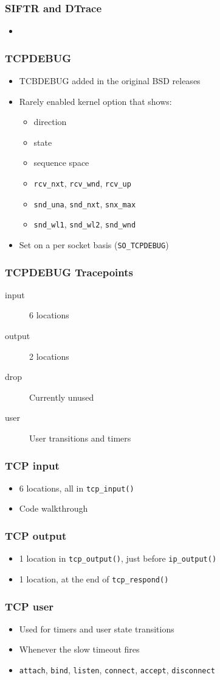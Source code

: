 \documentclass[pdftex]{beamer}
\begin{document}
\begin{frame}
  \frametitle{SIFTR and DTrace}
  \begin{itemize}
  \item 
  \end{itemize}
\end{frame}

\begin{frame}[fragile]
  \frametitle{TCPDEBUG}
  \begin{itemize}
  \item TCBDEBUG added in the original BSD releases
  \item Rarely enabled kernel option that shows:
    \begin{itemize}
    \item direction
    \item state
    \item sequence space
    \item \verb|rcv_nxt|, \verb|rcv_wnd|, \verb|rcv_up|
    \item \verb|snd_una|, \verb|snd_nxt|, \verb|snx_max|
    \item \verb|snd_wl1|, \verb|snd_wl2|, \verb|snd_wnd|
    \end{itemize}
  \item Set on a per socket basis (\verb|SO_TCPDEBUG|)
  \end{itemize}
\end{frame}

\begin{frame}
  \frametitle{TCPDEBUG Tracepoints}
  \begin{description}
  \item[input] 6 locations
  \item[output] 2 locations
  \item[drop] Currently unused
  \item[user] User transitions and timers
  \end{description}
\end{frame}

\begin{frame}[fragile]
  \frametitle{TCP input}
  \begin{itemize}
  \item 6 locations, all in \verb|tcp_input()|
  \item Code walkthrough
  \end{itemize}
\end{frame}

\begin{frame}[fragile]
  \frametitle{TCP output}
  \begin{itemize}
  \item 1 location in \verb|tcp_output()|, just before \verb|ip_output()|
  \item 1 location, at the end of \verb|tcp_respond()|
  \end{itemize}
\end{frame}

\begin{frame}[fragile]
  \frametitle{TCP user}
  \begin{itemize}
  \item Used for timers and user state transitions
  \item Whenever the slow timeout fires
  \item \verb|attach|, \verb|bind|, \verb|listen|, \verb|connect|,
    \verb|accept|, \verb|disconnect|
  \end{itemize}
\end{frame}
\end{document}
